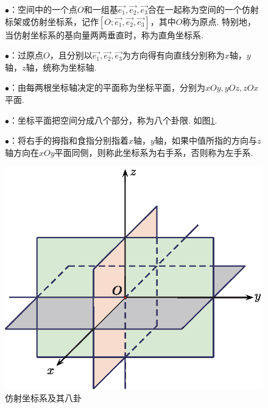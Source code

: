 \begin{enumerate}[]
	\setlength{\itemindent}{3em}
	\setlength{\topsep}{0.01em}
	\setlength{\itemsep}{0.01em}
	\begin{figure}[h]
		\begin{minipage}{0.6\linewidth}
			\item $\bullet$：空间中的一个点$O$和一组基$\overrightarrow{e_1},\overrightarrow{e_2},\overrightarrow{e_3}$合在一起称为空间的一个{\color{dy2}仿射标架}或{\color{dy2}仿射坐标系}，记作$[O;\overrightarrow{e_1},\overrightarrow{e_2},\overrightarrow{e_3}]$，其中$O$称为{\color{dy2}原点}. {\color{dy}特别地，当仿射坐标系的基向量两两垂直时，称为直角坐标系}.
			\item $\bullet$：过原点$O$，且分别以$\overrightarrow{e_1},\overrightarrow{e_2},\overrightarrow{e_3}$为方向得有向直线分别称为$x$轴，$y$轴，$z$轴，统称为{\color{dy2}坐标轴}. 
			\item$\bullet$：由每两根坐标轴决定的平面称为{\color{dy2}坐标平面}，分别为$xOy,yOz,zOx$平面. 
			\item $\bullet$：坐标平面把空间分成八个部分，称为八个{\color{dy2}卦限}. 如图\ref{八卦}. 
			\item $\bullet$：将右手的拇指和食指分别指着$x$轴，$y$轴，如果中值所指的方向与$z$轴方向在$xOy$平面同侧，则称此坐标系为{\color{dy2}右手系}，否则称为{\color{dy2}左手系}. 
		\end{minipage}
		\hfill
		\begin{minipage}{0.4\linewidth}
			\includegraphics[scale=0.75]{picture/C-1/1.1/BG.eps}
			\caption{仿射坐标系及其八卦}
			\label{八卦}
		\end{minipage}
	\end{figure}
\end{enumerate}
\jg
\jg

